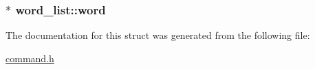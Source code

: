 \subsubsection[{\texorpdfstring{word}{word}}]{$\ast$ word\+\_\+list\+::word}\hypertarget{structword__list_ae717a8244fbbcb28ae1debd9da89a0ef}{}\label{structword__list_ae717a8244fbbcb28ae1debd9da89a0ef}


The documentation for this struct was generated from the following file\+:\begin{DoxyCompactItemize}
\item 
\hyperlink{command_8h}{command.\+h}\end{DoxyCompactItemize}
